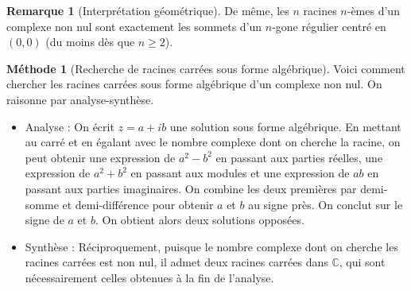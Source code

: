 \documentclass[french]{book}
\newcommand{\C}{\mathbb{C}}
\theoremstyle{plain}
\theoremstyle{definition}
\newtheorem{rmq}{Remarque}[chapter]
\newtheorem{met}{Méthode}[chapter]
\theoremstyle{remark}
\begin{document}
\begin{rmq}[Interprétation géométrique]
	De même, les $n$ racines $n$-èmes d'un complexe non nul sont exactement les sommets d'un $n$-gone régulier centré en $(0,0)$ (du moins dès que $n\geqslant2$).
\end{rmq}
\begin{met}[Recherche de racines carrées sous forme algébrique]
	Voici comment chercher les racines carrées sous forme algébrique d'un complexe non nul. On raisonne par analyse-synthèse.
	\begin{itemize}
		\item Analyse : On écrit $z=a+ib$ une solution sous forme algébrique. En mettant au carré et en égalant avec le nombre complexe dont on cherche la racine, on peut obtenir une expression de $a^2-b^2$ en passant aux parties réelles, une expression de $a^2+b^2$ en passant aux modules et une expression de $ab$ en passant aux parties imaginaires. On combine les deux premières par demi-somme et demi-différence pour obtenir $a$ et $b$ au signe près. On conclut sur le signe de $a$ et $b$. On obtient alors deux solutions opposées.
		\item Synthèse : Réciproquement, puisque le nombre complexe dont on cherche les racines carrées est non nul, il admet deux racines carrées dans $\C$, qui sont nécessairement celles obtenues à la fin de l'analyse.
	\end{itemize}
\end{met}
\end{document}
